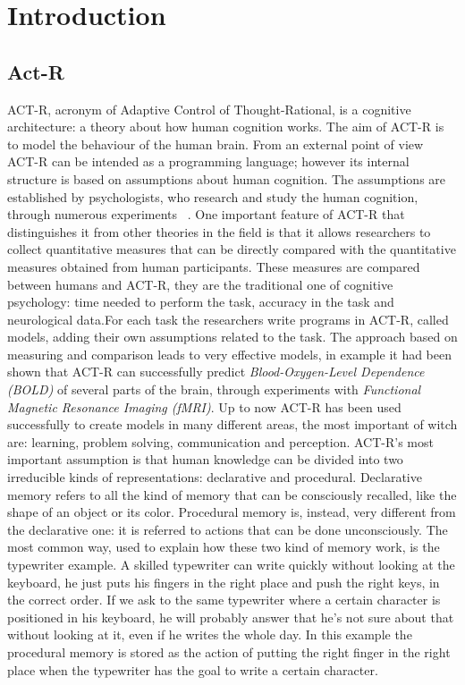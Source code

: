 \chapter{Introduction}
\section{Act-R}


ACT-R, acronym of Adaptive Control of Thought-Rational, is a cognitive architecture: a theory about how human cognition works. 
The aim of ACT-R is to model the behaviour of the human brain. From an external point of view ACT-R can be intended as a programming language; however its internal structure is based on assumptions about human cognition. The assumptions are established by psychologists, who research and study the human cognition, through numerous experiments ~\cite{Allen94}. 
One important feature of ACT-R that distinguishes it from other theories in the field is that it allows researchers to collect quantitative measures that can be directly compared with the quantitative measures obtained from human participants. These measures are compared between humans and ACT-R, they are the traditional one of cognitive psychology: time needed to perform the task, accuracy in the task and neurological data.For each task the researchers write programs in ACT-R, called models, adding their own assumptions related to the task. The approach based on measuring and comparison leads to very effective models, in example it had been shown that ACT-R can successfully predict \emph{Blood-Oxygen-Level Dependence (BOLD)} of several parts of the brain, through experiments with \emph{Functional Magnetic Resonance Imaging (fMRI)}.
Up to now ACT-R has been used successfully to create models in many different areas, the most important of witch are: learning, problem solving, communication and perception.
ACT-R's most important assumption is that human knowledge can be divided into two irreducible kinds of representations: declarative and procedural.
Declarative memory refers to all the kind of memory that can be consciously recalled, like the shape of an object or its color. Procedural memory is, instead, very different from the declarative one: it is referred to actions that can be done unconsciously. The most common way, used to explain how these two kind of memory work, is the typewriter example.
A skilled typewriter can write quickly without looking at the keyboard, he just puts his fingers in the right place and push the right keys, in the correct order. If we ask to the same typewriter where a certain character is positioned in his keyboard, he will probably answer that he's not sure about that without looking at it, even if he writes the whole day. In this example the procedural memory is stored as the action of putting the right finger in the right place when the typewriter has the goal to write a certain character.
